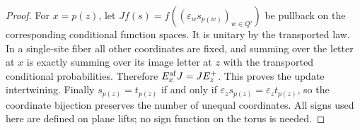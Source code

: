 \begin{proof}
For \(x=p(z)\), let \(Jf(s)=f((\varepsilon_w s_{p(w)})_{w\in Q'})\)
be pullback on the corresponding conditional function spaces.
It is unitary by the transported law. In a single-site fiber all
other coordinates are fixed, and summing over the letter at \(x\)
is exactly summing over its image letter at \(z\) with the
transported conditional probabilities. Therefore
\(E_x^{\rm af}J=J E_z^+\). This proves the update intertwining.
Finally \(s_{p(z)}=t_{p(z)}\) if and only if
\(\varepsilon_zs_{p(z)}=\varepsilon_zt_{p(z)}\), so the
coordinate bijection preserves the number of unequal coordinates.
All signs used here are defined on plane lifts; no sign function
on the torus is needed.
\end{proof}
